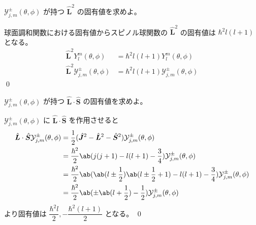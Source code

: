 \documentclass[uplatex,dvipdfmx,a4paper,11pt]{jlreq}
\makeatletter
\numberwithin{equation}{section}
\theoremstyle{definition}
\renewenvironment{proof}[1][\proofname]{\par
  \normalfont
  \topsep6\p@\@plus6\p@ \trivlist
  \item[\hskip\labelsep{\bfseries #1}\@addpunct{\bfseries}]\ignorespaces\quad\par
}{%
  \qed\endtrivlist\@endpefalse
}
\renewcommand\proofname{証明}
\makeatother
\begin{document}
\begin{problem}
$\mathcal{Y}_{j, m}^\pm(\theta, \phi)$ が持つ $\hat{\bm{L}}^2$ の固有値を求めよ。
\end{problem}
\begin{proof}
  球面調和関数における固有値からスピノル球関数の $\hat{\bm{L}}^2$ の固有値は $\hbar^2l(l+1)$ となる。
  \begin{align}
    \hat{\bm{L}}^2Y_l^m(\theta, \phi)                  & = \hbar^2l(l+1) Y_l^m(\theta, \phi)                  \\
    \hat{\bm{L}}^2\mathcal{Y}_{j, m}^\pm(\theta, \phi) & = \hbar^2l(l+1) \mathcal{Y}_{j, m}^\pm(\theta, \phi)
  \end{align}
\end{proof}

\begin{problem}
$\mathcal{Y}_{j, m}^\pm(\theta, \phi)$ が持つ $\hat{\bm{L}}\cdot\hat{\bm{S}}$ の固有値を求めよ。
\end{problem}
\begin{proof}
  $\mathcal{Y}_{j, m}^\pm(\theta, \phi)$ に $\hat{\bm{L}}\cdot\hat{\bm{S}}$ を作用させると
  \begin{align}
    \hat{\bm{L}}\cdot\hat{\bm{S}}\mathcal{Y}_{j, m}^\pm(\theta, \phi) & = \frac{1}{2}(\hat{\bm{J}}^2 - \hat{\bm{L}}^2 - \hat{\bm{S}}^2)\mathcal{Y}_{j, m}^\pm(\theta, \phi)                             \\
                                                                      & = \frac{\hbar^2}{2}\ab(j(j+1) - l(l+1) - \frac{3}{4})\mathcal{Y}_{j, m}^\pm(\theta, \phi)                                       \\
                                                                      & = \frac{\hbar^2}{2}\ab(\ab(l\pm \frac{1}{2})\ab(l\pm \frac{1}{2}+1) - l(l+1) - \frac{3}{4})\mathcal{Y}_{j, m}^\pm(\theta, \phi) \\
                                                                      & = \frac{\hbar^2}{2}\ab(\pm\ab(l + \frac{1}{2}) - \frac{1}{2})\mathcal{Y}_{j, m}^\pm(\theta, \phi)                               \\
  \end{align}
  より固有値は $\dfrac{\hbar^2l}{2}, -\dfrac{\hbar^2(l+1)}{2}$ となる。
\end{proof}
\end{document}
